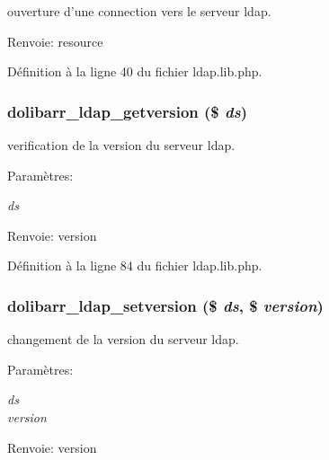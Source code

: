 ouverture d'une connection vers le serveur ldap. 

\begin{Desc}
\item[Renvoie:]resource \end{Desc}


D\'{e}finition \`{a} la ligne 40 du fichier ldap.lib.php.\hypertarget{ldap_8lib_8php_a3}{
\subsubsection[dolibarr\_\-ldap\_\-getversion]{\setlength{\rightskip}{0pt plus 5cm}dolibarr\_\-ldap\_\-getversion (\$ {\em ds})}}
\label{ldap_8lib_8php_a3}


verification de la version du serveur ldap. 

\begin{Desc}
\item[Param\`{e}tres:]
\begin{description}
\item[{\em ds}]\end{description}
\end{Desc}
\begin{Desc}
\item[Renvoie:]version \end{Desc}


D\'{e}finition \`{a} la ligne 84 du fichier ldap.lib.php.\hypertarget{ldap_8lib_8php_a4}{
\subsubsection[dolibarr\_\-ldap\_\-setversion]{\setlength{\rightskip}{0pt plus 5cm}dolibarr\_\-ldap\_\-setversion (\$ {\em ds}, \$ {\em version})}}
\label{ldap_8lib_8php_a4}


changement de la version du serveur ldap. 

\begin{Desc}
\item[Param\`{e}tres:]
\begin{description}
\item[{\em ds}]\item[{\em version}]\end{description}
\end{Desc}
\begin{Desc}
\item[Renvoie:]version \end{Desc}


